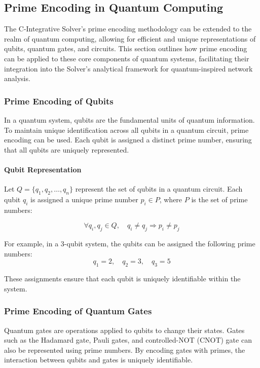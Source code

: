 \documentclass[%
 preprint, linenumbers,
 amsmath,amssymb,
 aps, physrev,
]{revtex4-2}
\begin{document}
\subsection{Prime Encoding in Quantum Computing}

The C-Integrative Solver’s prime encoding methodology can be extended to the realm of quantum computing, allowing for efficient and unique representations of qubits, quantum gates, and circuits. This section outlines how prime encoding can be applied to these core components of quantum systems, facilitating their integration into the Solver’s analytical framework for quantum-inspired network analysis.

\subsubsection{Prime Encoding of Qubits}

In a quantum system, qubits are the fundamental units of quantum information. To maintain unique identification across all qubits in a quantum circuit, prime encoding can be used. Each qubit is assigned a distinct prime number, ensuring that all qubits are uniquely represented.

\paragraph{Qubit Representation}

Let \( Q = \{q_1, q_2, \dots, q_n\} \) represent the set of qubits in a quantum circuit. Each qubit \( q_i \) is assigned a unique prime number \( p_i \in P \), where \( P \) is the set of prime numbers:

\[
\forall q_i, q_j \in Q, \quad q_i \neq q_j \Rightarrow p_i \neq p_j
\]

For example, in a 3-qubit system, the qubits can be assigned the following prime numbers:
\[
q_1 = 2, \quad q_2 = 3, \quad q_3 = 5
\]

These assignments ensure that each qubit is uniquely identifiable within the system.

\subsubsection{Prime Encoding of Quantum Gates}

Quantum gates are operations applied to qubits to change their states. Gates such as the Hadamard gate, Pauli gates, and controlled-NOT (CNOT) gate can also be represented using prime numbers. By encoding gates with primes, the interaction between qubits and gates is uniquely identifiable.
\end{document}
